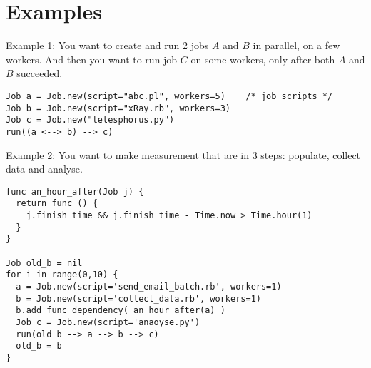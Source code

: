 \section{Examples}
\label{sect:ex}
Example 1: You want to create and run 2 jobs $A$ and $B$ in parallel, on a few
workers. And then you want to run job $C$ on some workers, only after both $A$
and $B$ succeeded.
\begin{lstlisting}
Job a = Job.new(script="abc.pl", workers=5)    /* job scripts */
Job b = Job.new(script="xRay.rb", workers=3)
Job c = Job.new("telesphorus.py")
run((a <--> b) --> c)
\end{lstlisting}
Example 2: You want to make measurement that are in 3 steps: populate, collect
data and analyse.
\begin{lstlisting}
func an_hour_after(Job j) {
  return func () {
    j.finish_time && j.finish_time - Time.now > Time.hour(1)
  }
}

Job old_b = nil
for i in range(0,10) {
  a = Job.new(script='send_email_batch.rb', workers=1)
  b = Job.new(script='collect_data.rb', workers=1)
  b.add_func_dependency( an_hour_after(a) )
  Job c = Job.new(script='anaoyse.py')
  run(old_b --> a --> b --> c)
  old_b = b
}
\end{lstlisting}

